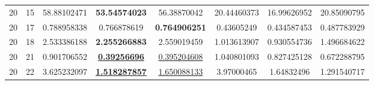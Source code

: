 \documentclass[runningheads]{llncs}
\begin{document}
\begin{table}[h!tb]
{\begin{tabular}{|c|c||c|c|c||c|c|c|}
20	&	15	&	58.88102471	&	\textbf{53.54574023}	&	56.38870042	&	20.44460373	&	16.99626952	&	20.85090795	\\
20	&	17	&	0.788958338	&	0.766878619	&	\textbf{0.764906251}	&	0.43605249	&	0.434587453	&	0.487783929	\\
20	&	18	&	2.533386188	&	\textbf{2.255266883}	&	2.559019459	&	1.013613907	&	0.930554736	&	1.496684622	\\
20	&	21	&	0.901706552	&	\underline{\textbf{0.39256696}}	&	\underline{0.395204608}	&	1.040801093	&	0.827425128	&	0.672288795	\\
20	&	22	&	3.625232097	&	\underline{\textbf{1.518287857}}	&	\underline{1.650088133}	&	3.97000465	&	1.64832496	&	1.291540717	\\

    \hline
    \end{tabular}}
    \label{tab:my_label}
\end{table}
\hfill\break
\end{document}

